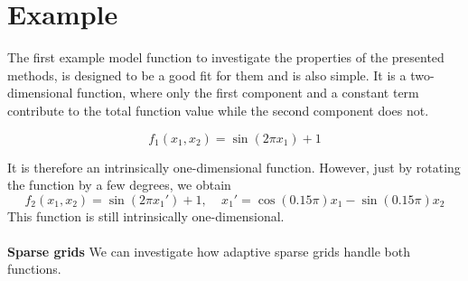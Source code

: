 \documentclass[
  a4paper,  %
  twoside,  %
  bibliography=totoc,
  headsepline,
  cleardoublepage=empty,
  parskip=half,
  draft=false
]{scrbook}
\begin{document}
\section{Example}

The first example model function to investigate the properties of the presented methods, is designed to be a good fit for them and is also simple.
It is a two-dimensional function, where only the first component and a constant term contribute to the total function value while the second component does not.

\begin{equation}
f_1(x_1, x_2)=\sin(2 \pi x_1) + 1
\nonumber
\end{equation}

It is therefore an intrinsically one-dimensional function.
However, just by rotating the function by a few degrees, we obtain
\begin{equation}
f_2(x_1,x_2)=\sin(2 \pi x_1') + 1, ~~~~~ x_1'=\cos(0.15 \pi) x_1 -\sin(0.15 \pi) x_2
\end{equation}
This function is still intrinsically one-dimensional.
\\
\\
\textbf{Sparse grids}
We can investigate how adaptive sparse grids handle both functions.
\end{document}
